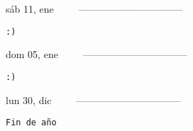 \documentclass[letterpaper,10pt]{article}
\begin{document}
\begin{multicols}{3}
{sáb 11, ene\ \ \ \ \ --------------------------------}
\begin{flushright}\begin{small}\texttt{:)}\end{small}\end{flushright}
\vfill
{dom 05, ene\ \ \ \ \ --------------------------------}
\begin{flushright}\begin{small}\texttt{:)}\end{small}\end{flushright}\par
\vfill
{lun 30, dic\ \ \ \ \ --------------------------------}
\begin{flushright}\begin{small}\texttt{Fin de año}\end{small}\end{flushright}\par
\vfill
\end{multicols}
\vspace{1.05cm}
\end{document}
